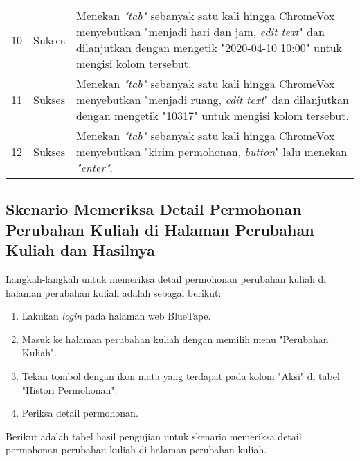 \begin{table}[H]
\begin{tabular}{|c|c|p{10cm}|}
        10 & Sukses & Menekan \textit{"tab"} sebanyak satu kali hingga ChromeVox menyebutkan "menjadi hari dan jam, \textit{edit text}" dan dilanjutkan dengan mengetik "2020-04-10 10:00" untuk mengisi kolom tersebut. \\
        11 & Sukses & Menekan \textit{"tab"} sebanyak satu kali hingga ChromeVox menyebutkan "menjadi ruang, \textit{edit text}" dan dilanjutkan dengan mengetik "10317" untuk mengisi kolom tersebut. \\
        12 & Sukses & Menekan \textit{"tab"} sebanyak satu kali hingga ChromeVox menyebutkan "kirim permohonan, \textit{button}" lalu menekan \textit{"enter"}. \\

        \bottomrule

    \end{tabular}
\end{table}

\subsection{Skenario Memeriksa Detail Permohonan Perubahan Kuliah di Halaman Perubahan Kuliah dan Hasilnya}
\label{subsec:skenario_memeriksa_detail_permohonan_perubahan_kuliah_di_halaman_perubahan_kuliah}
Langkah-langkah untuk memeriksa detail permohonan perubahan kuliah di halaman perubahan kuliah adalah sebagai berikut:

\begin{enumerate}
    \item Lakukan \textit{login} pada halaman web BlueTape.
    \item Masuk ke halaman perubahan kuliah dengan memilih menu "Perubahan Kuliah".
    \item Tekan tombol dengan ikon mata yang terdapat pada kolom "Aksi" di tabel "Histori Permohonan".
    \item Periksa detail permohonan.
\end{enumerate}

Berikut adalah tabel hasil pengujian untuk skenario memeriksa detail permohonan perubahan kuliah di halaman perubahan kuliah.


